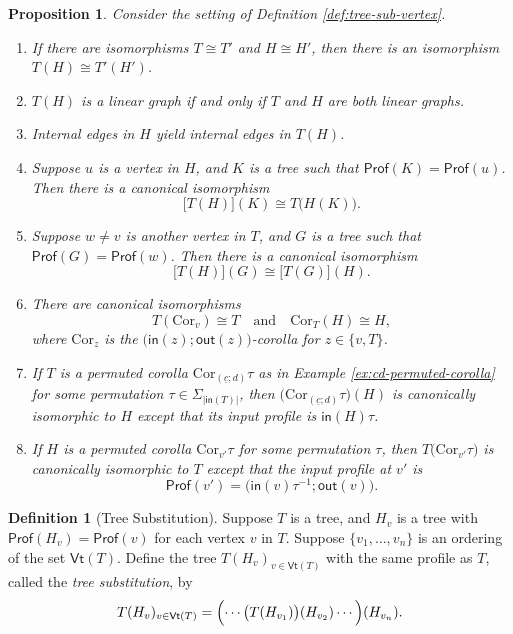 \documentclass[11pt]{amsbook}
\numberwithin{section}{chapter}
\numberwithin{subsection}{section}
\numberwithin{equation}{section}
\theoremstyle{plain}
\newtheorem{proposition}[equation]{Proposition}
\theoremstyle{definition}
\newtheorem{definition}[equation]{Definition}
\newcommand{\Cor}{\mathrm{Cor}}
\newcommand{\Prof}{\mathsf{Prof}}
\newcommand{\profofg}{\Prof(G)}
\newcommand{\profofhv}{\Prof(H_v)}
\newcommand{\profofk}{\Prof(K)}
\newcommand{\profofu}{\Prof(u)}
\newcommand{\profofv}{\Prof(v)}
\newcommand{\profofw}{\Prof(w)}
\newcommand{\Vt}{\mathsf{Vt}}
\newcommand{\inv}[1]{{#1}^{-1}}
\newcommand{\uc}{\underline c}
\newcommand{\inp}{\mathsf{in}}
\newcommand{\out}{\mathsf{out}}
\newcommand{\andspace}{\quad\text{and}\quad}
\begin{document}
\begin{proposition}\label{prop:tree-sub-properties}
Consider the setting of Definition \ref{def:tree-sub-vertex}.
\begin{enumerate}
\item If there are isomorphisms $T \cong T'$ and $H \cong H'$, then there is an isomorphism $T(H) \cong T'(H')$.
\item $T(H)$ is a linear graph if and only if $T$ and $H$ are both linear graphs.
\item Internal edges in $H$ yield internal edges in $T(H)$.
\item Suppose $u$ is a vertex in $H$, and $K$ is a tree such that $\profofk = \profofu$.  Then there is a canonical isomorphism
\begin{equation}\label{treesubass1}
\bigl[T(H)\bigr](K) \cong T\bigl(H(K)\bigr).
\end{equation}
\item Suppose $w\not= v$ is another vertex in $T$, and $G$ is a tree such that $\profofg = \profofw$.  Then there is a canonical isomorphism 
\begin{equation}\label{treesubass2}
\bigl[T(H)\bigr](G) \cong \bigl[T(G)\bigr](H).
\end{equation}
\item There are canonical isomorphisms
\begin{equation}\label{treesubunity}
T(\Cor_v) \cong T \andspace \Cor_T(H) \cong H,
\end{equation}
where $\Cor_z$ is the $\bigl(\inp(z);\out(z)\bigr)$-corolla for $z \in \{v,T\}$.
\item If $T$ is a permuted corolla $\Cor_{(\uc;d)}\tau$ as in Example \ref{ex:cd-permuted-corolla} for some permutation $\tau \in \Sigma_{|\inp(T)|}$, then $\bigl(\Cor_{(\uc;d)}\tau\bigr)(H)$ is canonically isomorphic to $H$ except that its input profile is $\inp(H)\tau$.
\item If $H$ is a permuted corolla $\Cor_{v'}\tau$ for some permutation $\tau$, then $T\bigl(\Cor_{v'}\tau\bigr)$ is canonically isomorphic to $T$ except that the input profile at $v'$ is \[\Prof(v') = \bigl(\inp(v)\inv{\tau}; \out(v)\bigr).\]
\end{enumerate}\end{proposition}

\begin{definition}[Tree Substitution]\label{def:tree-substitution}
Suppose $T$ is a tree, and $H_v$ is a tree with $\profofhv=\profofv$ for each vertex $v$ in $T$.  Suppose $\{v_1,\ldots,v_n\}$ is an ordering of the set $\Vt(T)$.  Define the tree $T(H_v)_{v\in \Vt(T)}$ with the same profile as $T$, called the \emph{tree substitution}, by \[T(H_v)_{v\in \Vt(T)} = \Bigl(\cdots\bigl(T(H_{v_1})\bigr)(H_{v_2}) \cdots\Bigr)(H_{v_n}).\]  
\end{definition}
\end{document}
